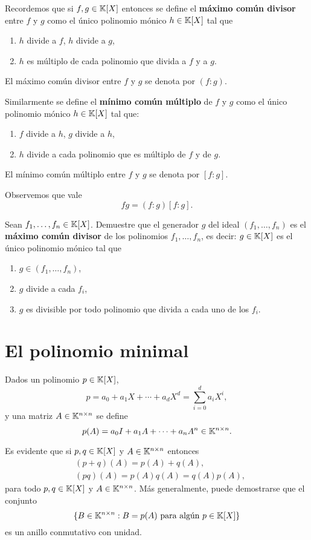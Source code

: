 \begin{block}
	Recordemos que si $f,g\in\mathbb{K}[X]$ entonces se define el \textbf{máximo común
	divisor} entre $f$ y $g$ como el único polinomio mónico $h\in\mathbb{K}[X]$ tal que 
	\begin{enumerate}
		\item $h$ divide a $f$, $h$ divide a $g$,
		\item $h$ es múltiplo de cada polinomio que divida a $f$ y a $g$. 
	\end{enumerate}

	El máximo común divisor entre $f$ y $g$ se denota por $(f:g)$. 

	Similarmente se define el \textbf{mínimo común múltiplo} de $f$ y $g$ como
	el único polinomio mónico $h\in\mathbb{K}[X]$ tal que: 
	\begin{enumerate}
		\item $f$ divide a $h$, $g$ divide a $h$,
		\item $h$ divide a cada polinomio que es múltiplo de $f$ y de $g$.
	\end{enumerate}

	El mínimo común múltiplo entre $f$ y $g$ se denota por $[f:g]$. 
	
	Observemos
	que vale 
	\[
		fg=(f:g)[f:g].
	\]
\end{block}

\begin{xca}
	Sean $f_1,\dots,f_n\in\mathbb{K}[X]$.  Demuestre que el generador $g$ del ideal
	$(f_1,\dots,f_n)$ es el \textbf{máximo común divisor} de los polinomios
	$f_1,\dots,f_n$, es decir: $g\in\mathbb{K}[X]$ es el único polinomio mónico tal que
	\begin{enumerate}
		\item $g\in(f_1,\dots,f_n)$,
		\item $g$ divide a cada $f_i$,
		\item $g$ es divisible por todo polinomio que divida a cada uno de los $f_i$.
	\end{enumerate}
\end{xca}


\section{El polinomio minimal}

\begin{block}
	Dados un polinomio $p\in\mathbb{K}[X]$, 
	\[
		p=a_0+a_1X+\cdots+a_dX^d=\sum_{i=0}^d a_iX^i, 
	\]
	y una matriz $A\in\mathbb{K}^{n\times n}$ se define 
	\[
		p(A)=a_0I+a_1A+\cdots+a_nA^n\in\mathbb{K}^{n\times n}.
	\]
	
	Es evidente que si $p,q\in\mathbb{K}[X]$ y $A\in\mathbb{K}^{n\times n}$ entonces
	\begin{align*}
		&(p+q)(A)=p(A)+q(A),\\
		&(pq)(A)=p(A)q(A)=q(A)p(A),
	\end{align*}
	para todo $p,q\in\mathbb{K}[X]$ y $A\in\mathbb{K}^{n\times n}$. Más generalmente, puede
	demostrarse que el conjunto
	\[
	\{B\in\mathbb{K}^{n\times n}:B=p(A)\text{ para algún $p\in\mathbb{K}[X]$}\}
	\]
	es un anillo conmutativo con unidad. 
\end{block}

